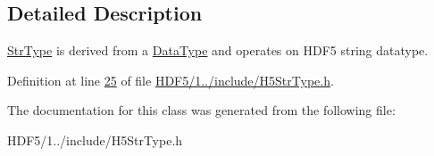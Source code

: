 \subsection{Detailed Description}
\hyperlink{class_h5_1_1_str_type}{Str\+Type} is derived from a \hyperlink{class_h5_1_1_data_type}{Data\+Type} and operates on H\+D\+F5 string datatype. 

Definition at line \hyperlink{_h_d_f5_21_810_81_2include_2_h5_str_type_8h_source_l00025}{25} of file \hyperlink{_h_d_f5_21_810_81_2include_2_h5_str_type_8h_source}{H\+D\+F5/1../include/\+H5\+Str\+Type.\+h}.



The documentation for this class was generated from the following file\+:\begin{DoxyCompactItemize}
\item 
H\+D\+F5/1../include/\+H5\+Str\+Type.\+h\end{DoxyCompactItemize}
